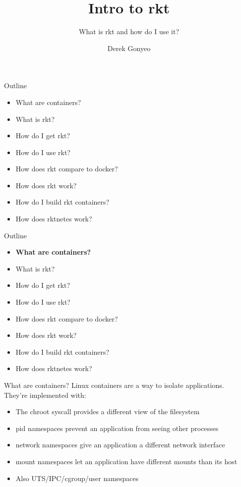 \documentclass[pdf,aspectratio=169]{beamer}
\title{Intro to rkt}
\subtitle{What is rkt and how do I use it?}
\author{Derek Gonyeo}
\begin{document}

\begin{frame}
    \titlepage
\end{frame}

\begin{frame}
    Outline
    \begin{itemize}
        \item What are containers?
        \item What is rkt?
        \item How do I get rkt?
        \item How do I use rkt?
        \item How does rkt compare to docker?
        \item How does rkt work?
        \item How do I build rkt containers?
        \item How does rktnetes work?
    \end{itemize}
\end{frame}


\begin{frame}
    Outline
    \begin{itemize}
        \item \textbf{What are containers?}
        \item What is rkt?
        \item How do I get rkt?
        \item How do I use rkt?
        \item How does rkt compare to docker?
        \item How does rkt work?
        \item How do I build rkt containers?
        \item How does rktnetes work?
    \end{itemize}
\end{frame}

\begin{frame}{What are containers?}
    Linux containers are a way to isolate applications. \\
    \vspace{1em}
    \pause
    They're implemented with:
    \begin{itemize}
        \item The chroot syscall provides a different view of the filesystem
        \item pid namespaces prevent an application from seeing other processes
        \item network namespaces give an application a different network
            interface
        \item mount namespaces let an application have different mounts than
            its host
        \item Also UTS/IPC/cgroup/user namespaces
    \end{itemize}
\end{frame}
\end{document}
